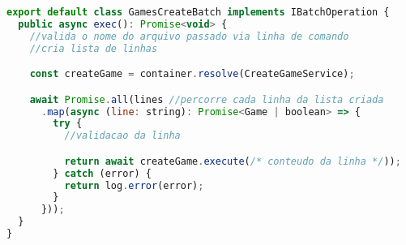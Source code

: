 \begin{lstlisting}[language=JavaScript, caption={Caso de Uso reaproveitado para processamento de arquivos},captionpos=b, label=alg:gamescreatebatch]
export default class GamesCreateBatch implements IBatchOperation {
  public async exec(): Promise<void> {
    //valida o nome do arquivo passado via linha de comando
    //cria lista de linhas

    const createGame = container.resolve(CreateGameService);

    await Promise.all(lines //percorre cada linha da lista criada
      .map(async (line: string): Promise<Game | boolean> => {
        try {
          //validacao da linha

          return await createGame.execute(/* conteudo da linha */));
        } catch (error) {
          return log.error(error);
        }
      }));
  }
}
\end{lstlisting}